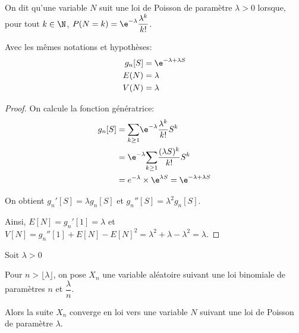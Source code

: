 \begin{de}
On dit qu'une variable $N$ suit une loi de Poisson de paramètre $\lambda > 0$ lorsque, pour tout $k \in \N$, $P(N=k) = \e^{-\lambda} \dfrac{\lambda^k}{k!}$.
\end{de}


\begin{prop}
Avec les mêmes notations et hypothèses:
\begin{align*}
g_n[S] & = \e^{-\lambda+\lambda S}\\
E(N) & = \lambda \\
V(N) & = \lambda
\end{align*}
\end{prop}

\begin{proof}
On calcule la fonction génératrice:
\begin{align*}
g_n[S] & = \displaystyle{\sum \limits_{k \geq 1}} \e^{-\lambda} \dfrac{\lambda^k}{k!} S^k \\
& = \e^{-\lambda} \displaystyle{\sum \limits_{k \geq 1}} \dfrac{(\lambda S)^k}{k!} S^k \\
& = e^{-\lambda} \times \e^{\lambda S}  = \e^{-\lambda + \lambda S}
\end{align*}

On obtient $g_n'[S] = \lambda g_n[S]$ et $g_n''[S] = \lambda^2 g_n[S]$. 

Ainsi, $E[N] = g_n'[1] = \lambda$ et $V[N] = g_n''[1] + E[N] - E[N]^2 = \lambda^2 + \lambda - \lambda^2 = \lambda$.
\end{proof}


\begin{prop}
Soit $\lambda > 0$

Pour $n> \lfloor \lambda \rfloor$, on pose $X_n$ une variable aléatoire suivant une loi binomiale de paramètres $n$ et $\dfrac{\lambda}{n}$.

Alors la suite $X_n$ converge en loi vers une variable $N$ suivant une loi de Poisson de paramètre $\lambda$.
\end{prop}


